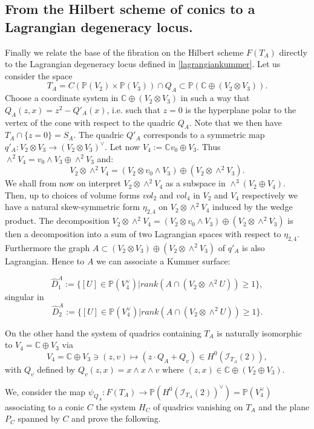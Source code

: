 \documentclass[a4paper,11pt]{amsart}
\theoremstyle{definition}
\numberwithin{equation}{section}
\numberwithin{equation}{section} \theoremstyle{definition}
\begin{document}
\subsection{From the Hilbert scheme of conics to a Lagrangian degeneracy locus.}
Finally we relate the base of the fibration on the Hilbert scheme $F(T_A)$ directly to the Lagrangian degeneracy locus defined in \ref{lagrangiankummer}.
Let us consider the space 
 \[
 T_A=C({{\mathbb{P}}}(V_2)\times {{\mathbb{P}}}(V_3))\cap Q_A\subset {{\mathbb{P}}}({{\mathbb{C}  }}\oplus (V_2\otimes  V_3)).
 \]
 Choose a coordinate system in ${{\mathbb{C}  }} \oplus (V_2\otimes  V_3)$ in such a way that $Q_A(z,x)=z^2-Q'_A(x)$, i.e. such that $z=0$ is the hyperplane polar to the vertex of the cone with respect to the quadric $Q_A$. Note that we then have $T_A\cap \{z=0\}= S_A$. The quadric $Q'_A$ corresponds to a symmetric map $q'_A: V_2\otimes V_3 \to (V_2\otimes V_3)^{\vee}$. Let now $V_4:={{\mathbb{C}  }} v_0 \oplus V_3$. Thus $\wedge^2 V_4= v_0\wedge V_3\oplus \wedge^2 V_3$ and:
 $$V_2\otimes \wedge^2 V_4= (V_2\otimes v_0\wedge V_3)\oplus (V_2\otimes \wedge^2 V_3).$$
We shall from now on interpret 
 $V_2\otimes \wedge^2 V_4$ as a subspace in $\wedge^3(V_2\oplus V_4)$. Then,
 up to choices of volume forms $vol_2$ and $vol_4$ in $V_2$ and $V_4$ respectively we have a natural skew-symmetric form $\eta_{2,4}$ on $V_2\otimes \wedge^2 V_4$ induced by the wedge product. The decomposition 
 $V_2\otimes \wedge^2 V_4= (V_2\otimes v_0\wedge V_3)\oplus (V_2\otimes \wedge^2 V_3)$ is then a decomposition into a sum of two Lagrangian spaces with respect to $\eta_{2,4}$. Furthermore the graph  $A\subset (V_2\otimes V_3)\oplus (V_2\otimes \wedge^2 V_3)$ of $q'_A$ is also Lagrangian. 
Hence to $A$ we can associate a Kummer surface:

$$\hat{D}_1^A:=\{[U]\in {{\mathbb{P}}}(V_4^{\vee}) | rank (A\cap (V_2\otimes \wedge^2 U)) \geq 1\},$$
singular in 
$$\hat{D}_2^A:=\{[U]\in {{\mathbb{P}}}(V_4^{\vee}) | rank (A\cap (V_2\otimes \wedge^2 U)) \geq 1\}.$$

On the other hand the system of quadrics containing $T_A$ is naturally isomorphic to $V_4={{\mathbb{C}  }} \oplus V_3$ via 
$$V_4={{\mathbb{C}  }} \oplus V_3 \ni (z,v)\mapsto (z\cdot Q_A+ Q_v)\in H^0({\mathcal I}_{T_A}(2)),$$
with $Q_v$ defined by $Q_v(z,x)=x\wedge x\wedge v$ where $(z,x)\in {{\mathbb{C}  }}\oplus(V_2\oplus V_3)$.

We, consider the map $\psi_{Q_A}: F(T_A)\to {{\mathbb{P}}}(H^0({\mathcal I}_{T_A}(2))^{\vee})={{\mathbb{P}}}(V_4^{\vee})$ associating to a conic $C$ the system $H_C$ of quadrics vanishing on $T_A$ and the plane $P_C$ spanned by $C$ and prove the following.
 
\end{document}
